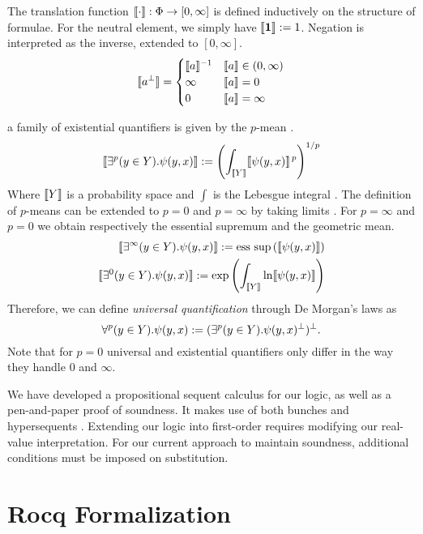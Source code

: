 \documentclass[sigplan, screen, review, nonacm]{acmart}
\begin{document}
The translation function $\llbracket \cdot \rrbracket : \Phi \rightarrow [0,\infty]$ is defined inductively on the structure of formulae. For the neutral element, we simply have $\llbracket \textbf{1} \rrbracket := 1$. Negation is interpreted as the inverse, extended to $[0,\infty]$. 
    \[  \llbracket a ^\bot \rrbracket =
    \begin{cases}
    \llbracket a \rrbracket ^{-1}  & \llbracket a \rrbracket \in (0,\infty)  \\
    \infty & \llbracket a \rrbracket = 0 \\
    0 & \llbracket a \rrbracket = \infty \\
   \end{cases}
    \]

a family of existential quantifiers is given by the $p$-mean \citep{capucci2024quantifiers}.
\begin{equation*}
        \llbracket \exists^{p}(y \in Y).\psi(y, x) \rrbracket := \left(\int_{\llbracket Y \rrbracket} \llbracket \psi(y,x) \rrbracket^{\,p}\right)^{1/p}
    \end{equation*}
Where $\llbracket Y \rrbracket$ is a probability space and $\int{}$ is the Lebesgue integral \citep{mitrinovic1970analytic}.
The definition of $p$-means can be extended to $p=0$ and $p=\infty$ by taking limits \cite{capucci2024quantifiers}. For $p=\infty$ and $p = 0$ we obtain respectively the essential supremum and the geometric mean. 
\begin{equation*}
\begin{split}
    \llbracket \exists^{\infty}(y \in Y).\psi(y, x) \rrbracket := \mathrm{ess}\, \sup\,(\llbracket \psi(y, x) \rrbracket)\\
    \llbracket \exists^{0}(y \in Y).\psi(y,x) \rrbracket := \exp \left(\int_{\llbracket Y \rrbracket} \ln \llbracket \psi(y, x) \rrbracket\right)
\end{split}
\end{equation*}
Therefore, we can define \textit{universal quantification} through De Morgan's laws as $$\forall^{p}(y \in Y).\psi(y, x) := (\exists^{p}(y \in Y).\psi(y, x) ^\bot) ^\bot.$$
Note that for $p = 0$ universal and existential quantifiers only differ in the way they handle $0$ and $\infty$.

 We have developed a propositional sequent calculus for our logic, as well as a pen-and-paper proof of soundness. It makes use of both bunches \citep{o1999logic} and hypersequents \citep{prooffuzzy}. Extending our logic into first-order requires modifying our real-value interpretation. For our current approach to maintain soundness, additional conditions must be imposed on substitution. 
\section{Rocq Formalization}
\end{document}
